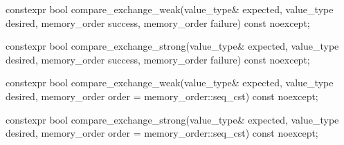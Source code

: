 %
%
%
%
%
%
%
%
\begin{itemdecl}
constexpr bool compare_exchange_weak(value_type& expected, value_type desired,
                           memory_order success, memory_order failure) const noexcept;

constexpr bool compare_exchange_strong(value_type& expected, value_type desired,
                             memory_order success, memory_order failure) const noexcept;

constexpr bool compare_exchange_weak(value_type& expected, value_type desired,
                           memory_order order = memory_order::seq_cst) const noexcept;

constexpr bool compare_exchange_strong(value_type& expected, value_type desired,
                             memory_order order = memory_order::seq_cst) const noexcept;
\end{itemdecl}


